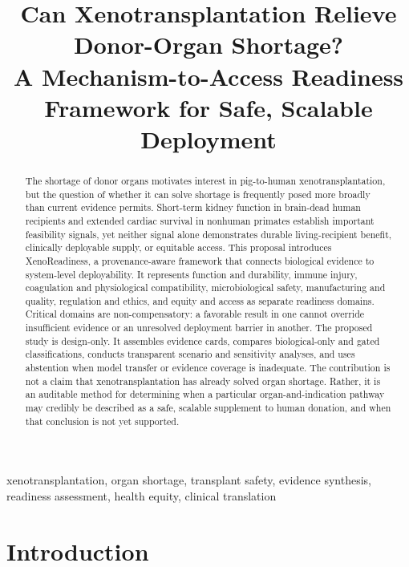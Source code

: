 \documentclass[conference]{IEEEtran}
\begin{document}
\title{Can Xenotransplantation Relieve Donor-Organ Shortage?\\
A Mechanism-to-Access Readiness Framework for Safe, Scalable Deployment}

\author{}
\maketitle

\begin{abstract}
The shortage of donor organs motivates interest in pig-to-human xenotransplantation, but the question of whether it can solve shortage is frequently posed more broadly than current evidence permits. Short-term kidney function in brain-dead human recipients and extended cardiac survival in nonhuman primates establish important feasibility signals, yet neither signal alone demonstrates durable living-recipient benefit, clinically deployable supply, or equitable access. This proposal introduces XenoReadiness, a provenance-aware framework that connects biological evidence to system-level deployability. It represents function and durability, immune injury, coagulation and physiological compatibility, microbiological safety, manufacturing and quality, regulation and ethics, and equity and access as separate readiness domains. Critical domains are non-compensatory: a favorable result in one cannot override insufficient evidence or an unresolved deployment barrier in another. The proposed study is design-only. It assembles evidence cards, compares biological-only and gated classifications, conducts transparent scenario and sensitivity analyses, and uses abstention when model transfer or evidence coverage is inadequate. The contribution is not a claim that xenotransplantation has already solved organ shortage. Rather, it is an auditable method for determining when a particular organ-and-indication pathway may credibly be described as a safe, scalable supplement to human donation, and when that conclusion is not yet supported.
\end{abstract}

\begin{IEEEkeywords}
xenotransplantation, organ shortage, transplant safety, evidence synthesis, readiness assessment, health equity, clinical translation
\end{IEEEkeywords}

\section{Introduction}
\end{document}
